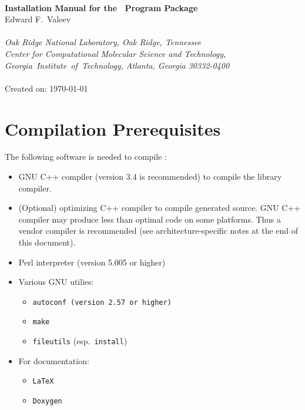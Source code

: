 \documentclass[12pt]{article}
\begin{document}


\begin{center}
\ \\
\vspace{2.0in}
{\bf {\Large Installation Manual for the \LIBINT\ Program Package}} \\
\vspace{0.5in}
Edward F.\ Valeev \\
\ \\
{\em Oak Ridge National Laboratory, Oak Ridge, Tennessee}\\
\vspace{0.1in}
{\em Center for Computational Molecular Science and Technology, \mbox{Georgia 
Institute of Technology,} Atlanta, Georgia 30332-0400} 
\ \\
\vspace{0.3in}
\LIBINTv \\
Created on: \today
\end{center}

\thispagestyle{empty}

\newpage
\section{Compilation Prerequisites}

The following software is needed to compile \LIBINTv:
\begin{itemize}
\item GNU C++ compiler (version 3.4 is recommended) to compile the library compiler.
\item (Optional) optimizing C++ compiler
to compile generated source. GNU C++ compiler may produce less than optimal code on some platforms.
Thus a vendor compiler is recommended (see architecture-specific notes at the end of this document).
\item Perl interpreter (version 5.005 or higher)
\item Various GNU utilies: 
\begin{itemize}
\item {\tt autoconf (version 2.57 or higher)}
\item {\tt make}
\item {\tt fileutils} (esp.\ {\tt install})
\end{itemize}
\item For documentation:
\begin{itemize}
\item {\tt LaTeX}
\item {\tt Doxygen}
\end{itemize}
\end{itemize}
\end{document}
